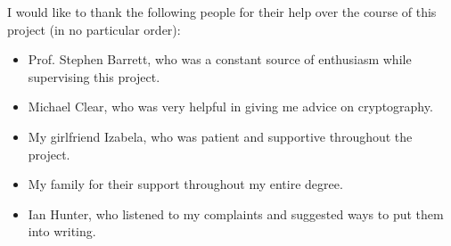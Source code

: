 \newpage
{}
\tableofcontents

\listoffigures
\listoftables


\begin{acknowledgments}

I would like to thank the following people for their help over the course of this project (in no particular order):
\begin{itemize}
	\item Prof. Stephen Barrett, who was a constant source of enthusiasm while supervising this project.
	\item Michael Clear, who was very helpful in giving me advice on cryptography.
	\item My girlfriend Izabela, who was patient and supportive throughout the project.
	\item My family for their support throughout my entire degree.
    \item Ian Hunter, who listened to my complaints and suggested ways to put them into writing.
\end{itemize}
\end{acknowledgments}


\newpage

\startarabicpagination


